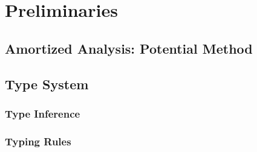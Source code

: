 \chapter{Preliminaries} \label{chap:linear}

\section{Amortized Analysis: Potential Method}

\section{Type System}

\subsection{Type Inference}
\subsection{Typing Rules}



